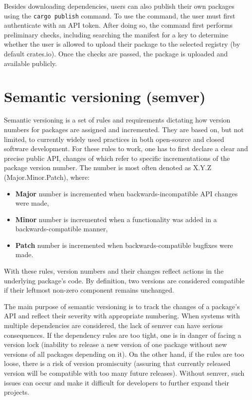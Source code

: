 \documentclass[licencjacka,en]{pracamgr}
\begin{document}
Besides downloading dependencies, users can also publish their own packages using
the \texttt{cargo publish} command. To use the command, the user must first authenticate with
an API token. After doing so, the command first performs preliminary checks, including searching
the manifest for a key to determine whether the user is allowed to upload their package
to the selected registry (by default crates.io). Once the checks are passed, the package is
uploaded and available publicly.

\section{Semantic versioning (semver)}\label{r:section_semver}

Semantic versioning is a set of rules and requirements dictating how version numbers for packages
are assigned and incremented. They are based on, but not limited, to currently widely used
practices in both open-source and closed software development. For these rules to work, one has to
first declare a clear and precise public API, changes of which refer to specific incrementations of
the package version number. The number is most often denoted as X.Y.Z (Major.Minor.Patch), where:
\begin{itemize}
	\item \textbf{Major} number is incremented when backwards-incompatible API changes were made,
	\item \textbf{Minor} number is incremented when a functionality was added in
		a backwards-compatible manner,
	\item \textbf{Patch} number is incremented when backwards-compatible bugfixes were made.
\end{itemize}
With these rules, version numbers and their changes reflect actions in the underlying
package's code. By definition, two versions are considered compatible if their leftmost non-zero
component remains unchanged.

The main purpose of semantic versioning is to track the changes of a package's API and reflect
their severity with appropriate numbering.
When systems with multiple dependencies are considered, the lack of semver can have serious
consequences. If the dependency rules are too tight, one is in danger of facing a version lock
(inability to release a new version of one package without new versions of all packages depending
on it). On the other hand, if the rules are too loose, there is a risk of version promiscuity
(assuring that currently released version will be compatible with too many future releases).
Without semver, such issues can occur and make it difficult for developers to further expand
their projects.
\end{document}
